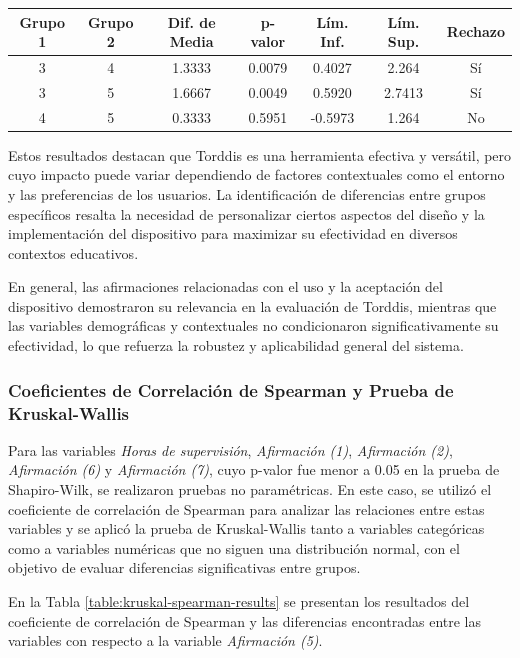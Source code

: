 \documentclass[a4paper,fleqn]{cas-sc}
\begin{document}
\begin{itemize}
\begin{table}[ht]
								\begin{tabularx}{0.75\textwidth}{ccccccc}
									\hline
									\textbf{Grupo 1} & \textbf{Grupo 2} & \textbf{Dif. de Media} & \textbf{p-valor} & \textbf{Lím. Inf.} & \textbf{Lím. Sup.} & \textbf{Rechazo} \\
									\hline
									3 & 4 & 1.3333 & 0.0079 & 0.4027 & 2.264 & Sí \\
									3 & 5 & 1.6667 & 0.0049 & 0.5920 & 2.7413 & Sí \\
									4 & 5 & 0.3333 & 0.5951 & -0.5973 & 1.264 & No \\
									\hline
								\end{tabularx}
								\label{table:posthoc_6y7}
							\end{table}
					\end{itemize}
					
					Estos resultados destacan que Torddis es una herramienta efectiva y versátil, pero cuyo impacto puede variar dependiendo de factores contextuales como el entorno y las preferencias de los usuarios. La identificación de diferencias entre grupos específicos resalta la necesidad de personalizar ciertos aspectos del diseño y la implementación del dispositivo para maximizar su efectividad en diversos contextos educativos.
						
					En general, las afirmaciones relacionadas con el uso y la aceptación del dispositivo demostraron su relevancia en la evaluación de Torddis, mientras que las variables demográficas y contextuales no condicionaron significativamente su efectividad, lo que refuerza la robustez y aplicabilidad general del sistema.
					
				\subsubsection{Coeficientes de Correlación de Spearman y Prueba de Kruskal-Wallis}
					Para las variables \textit{Horas de supervisión}, \textit{Afirmación (1)}, \textit{Afirmación (2)}, \textit{Afirmación (6)} y \textit{Afirmación (7)}, cuyo p-valor fue menor a 0.05 en la prueba de Shapiro-Wilk, se realizaron pruebas no paramétricas. En este caso, se utilizó el coeficiente de correlación de Spearman para analizar las relaciones entre estas variables y se aplicó la prueba de Kruskal-Wallis tanto a variables categóricas como a variables numéricas que no siguen una distribución normal, con el objetivo de evaluar diferencias significativas entre grupos.
					
					En la Tabla \ref{table:kruskal-spearman-results} se presentan los resultados del coeficiente de correlación de Spearman y las diferencias encontradas entre las variables con respecto a la variable \textit{Afirmación (5)}.
					
\end{document}
